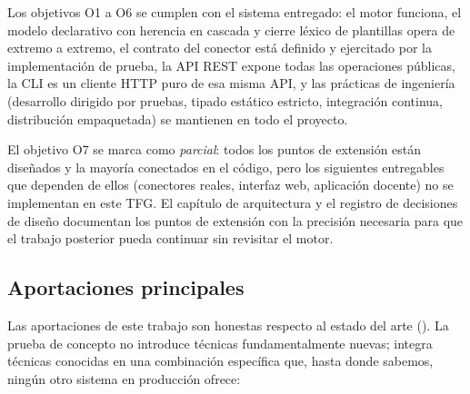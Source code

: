 Los objetivos O1 a O6 se cumplen con el sistema entregado: el motor
funciona, el modelo declarativo con herencia en cascada y cierre
léxico de plantillas opera de extremo a extremo, el contrato del
conector está definido y ejercitado por la implementación de
prueba, la API REST expone todas las operaciones públicas, la CLI
es un cliente HTTP puro de esa misma API, y las prácticas de
ingeniería (desarrollo dirigido por pruebas, tipado estático
estricto, integración continua, distribución empaquetada) se
mantienen en todo el proyecto.

El objetivo O7 se marca como \emph{parcial}: todos los puntos de
extensión están diseñados y la mayoría conectados en el código,
pero los siguientes entregables que dependen de ellos (conectores
reales, interfaz web, aplicación docente) no se implementan en este
TFG. El capítulo de arquitectura y el registro de decisiones de
diseño documentan los puntos de extensión con la precisión
necesaria para que el trabajo posterior pueda continuar sin
revisitar el motor.

\subsection{Aportaciones principales}

Las aportaciones de este trabajo son honestas respecto al estado
del arte (). La prueba de concepto no
introduce técnicas fundamentalmente nuevas; integra técnicas
conocidas en una combinación específica que, hasta donde sabemos,
ningún otro sistema en producción ofrece:

